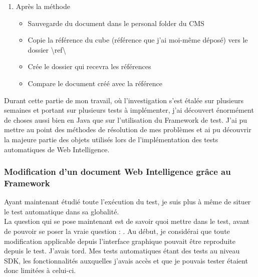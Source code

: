 \begin{enumerate}
\begin{itemize}
	\end{itemize}
	\item Apr\`{e}s la m\'{e}thode 
	\begin{itemize}
		\item Sauvegarde du document dans le personal folder du \gls{CMS}
		\item Copie la r\'{e}f\'{e}rence du cube (r\'{e}f\'{e}rence que j'ai moi-m\^{e}me d\'{e}pos\'{e}) vers le dossier \textbackslash ref\textbackslash
		\item Cr\'{e}e le dossier qui recevra les r\'{e}f\'{e}rences
		\item Compare le document cr\'{e}\'{e} avec la r\'{e}f\'{e}rence
	\end{itemize}
\end{enumerate}

Durant cette partie de mon travail, o\`{u} l'investigation s'est \'{e}tal\'{e}e sur plusieurs semaines et portant sur plusieurs tests \`{a} impl\'{e}menter, j'ai d\'{e}couvert \'{e}norm\'{e}ment de choses aussi bien en \gls{Java} que sur l'utilisation du \gls{Framework} de test. J'ai pu mettre au point des m\'{e}thodes de r\'{e}solution de mes probl\`{e}mes et ai pu d\'{e}couvrir la majeure partie des objets utilis\'{e}s lors de l'impl\'{e}mentation des tests automatiques de Web Intelligence.


\subsubsection{Modification d'un document Web Intelligence gr\^{a}ce au \gls{Framework}}

Ayant maintenant \'{e}tudi\'{e} toute l'ex\'{e}cution du test, je suis plus \`{a} m\^{e}me de situer le test automatique dans sa globalit\'{e}.\\
La question qui se pose maintenant est de savoir quoi mettre dans le test, avant de pouvoir se poser la vraie question : . Au d\'{e}but, je consid\'{e}rai que toute modification applicable depuis l'interface graphique pouvait \^{e}tre reproduite depuis le test. J'avais tord. Mes tests automatiques \'{e}tant des tests au niveau SDK, les fonctionnalit\'{e}s auxquelles j'avais acc\`{e}s et que je pouvais tester \'{e}taient donc limit\'{e}es \`{a} celui-ci.\\

